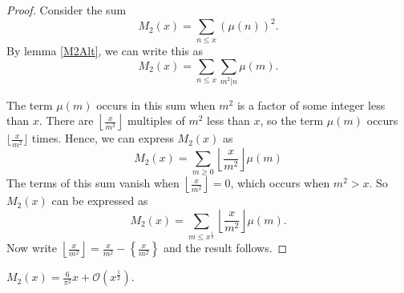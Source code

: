 \documentclass{unswmaths}
\begin{document}
\begin{proof}
    Consider the sum
    \begin{equation*}
        M_2(x) = \sum_{n\leq x} (\mu(n))^2.
    \end{equation*}
    By lemma \ref{M2Alt}, we can write this as
    \begin{equation*}
        M_2(x) = \sum_{n\leq x}\sum_{m^2|n}\mu(m).
    \end{equation*}
    
    The term $\mu(m)$ occurs in this sum when $m^2$ is a factor of some integer
    less than $x$. There are $\left\lfloor \frac{x}{m^2}\right\rfloor$ multiples of $m^2$
    less than $x$, so the term $\mu(m)$ occurs $\lfloor \frac{x}{m^2}\rfloor$
    times. Hence, we can express $M_2(x)$ as
    \begin{equation*}
        M_2(x) = \sum_{m\geq0} \left\lfloor\frac{x}{m^2}\right\rfloor\mu(m)
    \end{equation*}
    The terms of this sum vanish when $\left\lfloor \frac{x}{m^2}\right\rfloor = 0$,
    which occurs when $m^2 > x$. So $M_2(x)$ can be expressed as
    \begin{equation*}
        M_2(x) = \sum_{m\leq x^\frac{1}{2}}\left\lfloor\frac{x}{m^2}\right\rfloor\mu(m).
    \end{equation*}
    Now write $\left\lfloor\frac{x}{m^2}\right\rfloor = \frac{x}{m^2}-\left\{\frac{x}{m^2}\right\}$
    and the result follows.
\end{proof}
\begin{theorem}
    $M_2(x) = \frac{6}{\pi^2}x+\mathcal{O}(x^\frac{1}{2})$.
\end{theorem}
\end{document}
